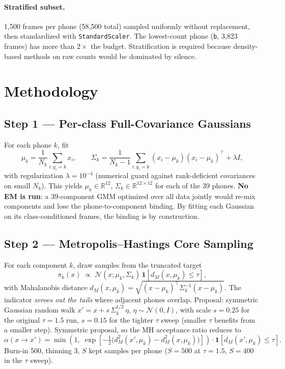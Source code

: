 \documentclass[11pt]{article}
\begin{document}
\paragraph{Stratified subset.} 1{,}500 frames per phone (58{,}500 total) sampled uniformly without replacement, then standardized with \texttt{StandardScaler}. The lowest-count phone (\texttt{b}, 3{,}823 frames) has more than $2\times$ the budget. Stratification is required because density-based methods on raw counts would be dominated by silence.

\section*{Methodology}

\subsection*{Step 1 --- Per-class Full-Covariance Gaussians}

For each phone $k$, fit
\[
\mu_k = \frac{1}{N_k}\sum_{i:y_i=k} x_i, \qquad
\Sigma_k = \frac{1}{N_k - 1}\sum_{i:y_i=k}(x_i - \mu_k)(x_i - \mu_k)^\top + \lambda I,
\]
with regularization $\lambda = 10^{-4}$ (numerical guard against rank-deficient covariances on small $N_k$). This yields $\mu_k \in \mathbb{R}^{12}$, $\Sigma_k \in \mathbb{R}^{12\times 12}$ for each of the 39 phones. \textbf{No EM is run}: a 39-component GMM optimized over all data jointly would re-mix components and lose the phone-to-component binding. By fitting each Gaussian on its class-conditioned frames, the binding is by construction.

\subsection*{Step 2 --- Metropolis--Hastings Core Sampling}

For each component $k$, draw samples from the truncated target
\[
\pi_k(x) \;\propto\; \mathcal{N}(x; \mu_k, \Sigma_k)\,\mathbf{1}\!\left[d_M(x,\mu_k) \le \tau\right],
\]
with Mahalanobis distance $d_M(x,\mu_k) = \sqrt{(x-\mu_k)^\top \Sigma_k^{-1} (x-\mu_k)}$. The indicator \emph{zeroes out the tails} where adjacent phones overlap. Proposal: symmetric Gaussian random walk $x' = x + s\,\Sigma_k^{1/2}\,\eta$, $\eta \sim \mathcal{N}(0, I)$, with scale $s = 0.25$ for the original $\tau = 1.5$ run, $s = 0.15$ for the tighter $\tau$ sweep (smaller $\tau$ benefits from a smaller step). Symmetric proposal, so the MH acceptance ratio reduces to
\[
\alpha(x \to x') = \min\!\left(1,\; \exp\!\left[-\tfrac{1}{2}\bigl(d_M^2(x',\mu_k) - d_M^2(x,\mu_k)\bigr)\right]\right) \cdot \mathbf{1}\!\left[d_M(x',\mu_k)\le\tau\right].
\]
Burn-in 500, thinning 3, $S$ kept samples per phone ($S = 500$ at $\tau = 1.5$, $S = 400$ in the $\tau$ sweep).
\end{document}
